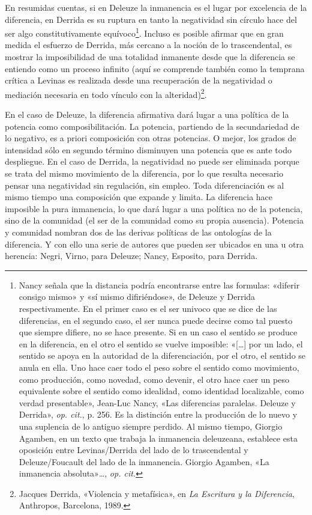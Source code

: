 En resumidas cuentas, si en Deleuze la inmanencia es el lugar por excelencia de la diferencia, en Derrida es su ruptura en tanto la negatividad sin círculo hace del ser algo constitutivamente equívoco\footnote{Nancy señala que la distancia podría encontrarse entre las formulas: «diferir consigo mismo» y «sí mismo difiriéndose», de Deleuze y Derrida respectivamente. En el primer caso es el ser univoco que se dice de las diferencias, en el segundo caso, el ser nunca puede decirse como tal puesto que siempre difiere, no se hace presente. Si en un caso el sentido se produce en la diferencia, en el otro el sentido se vuelve imposible: «{[}\ldots{]} por un lado, el sentido se apoya en la autoridad de la diferenciación, por el otro, el sentido se anula en ella. Uno hace caer todo el peso sobre el sentido como movimiento, como producción, como novedad, como devenir, el otro hace caer un peso equivalente sobre el sentido como idealidad, como identidad localizable, como verdad presentable», Jean-Luc Nancy, «Las diferencias paralelas. Deleuze y Derrida», \emph{op. cit.}, p. 256. Es la distinción entre la producción de lo nuevo y una suplencia de lo antiguo siempre perdido. Al mismo tiempo, Giorgio Agamben, en un texto que trabaja la inmanencia deleuzeana, establece esta oposición entre Levinas/Derrida del lado de lo trascendental y Deleuze/Foucault del lado de la inmanencia. Giorgio Agamben, «La inmanencia absoluta»\ldots, \emph{op. cit.}}. Incluso es posible afirmar que en gran medida el esfuerzo de Derrida, más cercano a la noción de lo trascendental, es mostrar la imposibilidad de una totalidad inmanente desde que la diferencia se entiendo como un proceso infinito (aquí se comprende también como la temprana crítica a Levinas es realizada desde una recuperación de la negatividad o mediación necesaria en todo vínculo con la alteridad)\footnote{Jacques Derrida, «Violencia y metafísica», en \emph{La Escritura y la Diferencia}, Anthropos, Barcelona, 1989.}.

En el caso de Deleuze, la diferencia afirmativa dará lugar a una política de la potencia como composibilitación. La potencia, partiendo de la secundariedad de lo negativo, es a priori composición con otras potencias. O mejor, los grados de intensidad sólo en segundo término disminuyen una potencia que es ante todo despliegue. En el caso de Derrida, la negatividad no puede ser eliminada porque se trata del mismo movimiento de la diferencia, por lo que resulta necesario pensar una negatividad sin regulación, sin empleo. Toda diferenciación es al mismo tiempo una composición que expande y limita. La diferencia hace imposible la pura inmanencia, lo que dará lugar a una política no de la potencia, sino de la comunidad (el ser de la comunidad como su propia ausencia). Potencia y comunidad nombran dos de las derivas políticas de las ontologías de la diferencia. Y con ello una serie de autores que pueden ser ubicados en una u otra herencia: Negri, Virno, para Deleuze; Nancy, Esposito, para Derrida.

